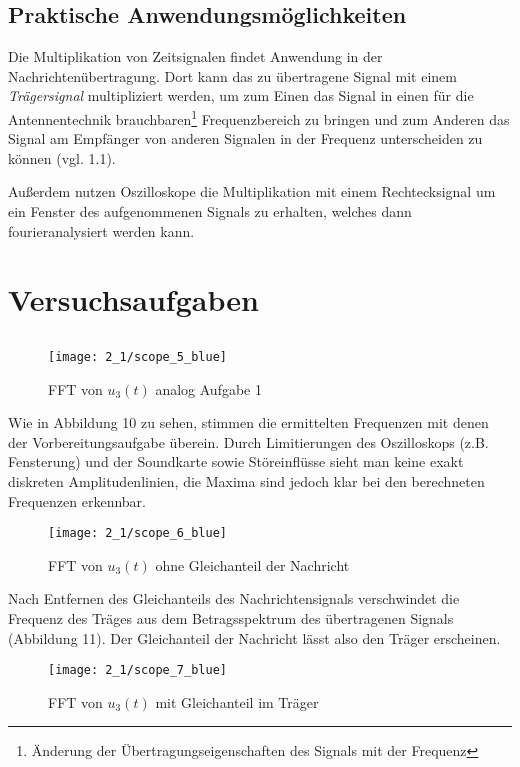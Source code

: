 \documentclass[a4paper, 12pt]{article}
\begin{document}
\subsection{Praktische Anwendungsmöglichkeiten}

Die Multiplikation von Zeitsignalen findet Anwendung in der Nachrichtenübertragung. Dort kann das zu übertragene Signal mit einem \emph{Trägersignal} multipliziert werden, um zum Einen das Signal in einen für die Antennentechnik brauchbaren\footnote{Änderung der Übertragungseigenschaften des Signals mit der Frequenz} Frequenzbereich zu bringen und zum Anderen das Signal am Empfänger von anderen Signalen in der Frequenz unterscheiden zu können (vgl. 1.1).

Außerdem nutzen Oszilloskope die Multiplikation mit einem Rechtecksignal um ein Fenster des aufgenommenen Signals zu erhalten, welches dann fourieranalysiert werden kann.

\section{Versuchsaufgaben}

\subsection{}

\begin{figure}[H]
  \texttt{[image: 2\_1/scope\_5\_blue]}
  \caption{FFT von $u_3(t)$ analog Aufgabe 1}
\end{figure}

Wie in Abbildung 10 zu sehen, stimmen die ermittelten Frequenzen mit denen der
Vorbereitungsaufgabe überein.
Durch Limitierungen des Oszilloskops (z.B.
Fensterung) und der Soundkarte sowie Störeinflüsse sieht man keine exakt
diskreten Amplitudenlinien, die Maxima sind jedoch klar bei den berechneten
Frequenzen erkennbar.

\begin{figure}[H]
  \texttt{[image: 2\_1/scope\_6\_blue]}
  \caption{FFT von $u_3(t)$ ohne Gleichanteil der Nachricht}
\end{figure}

Nach Entfernen des Gleichanteils des Nachrichtensignals verschwindet die Frequenz des
Träges aus dem Betragsspektrum des übertragenen Signals (Abbildung 11). Der Gleichanteil der Nachricht lässt also den Träger erscheinen. 

\begin{figure}[H]
  \texttt{[image: 2\_1/scope\_7\_blue]}
  \caption{FFT von $u_3(t)$ mit Gleichanteil im Träger}
\end{figure}
\end{document}
